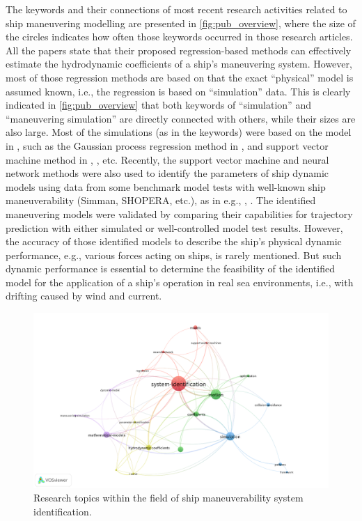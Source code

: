 The keywords and their connections of most recent research activities related to ship maneuvering modelling are presented in \autoref{fig:pub_overview}, where the size of the circles indicates how often those keywords occurred in those research articles. All the papers state that their proposed regression-based methods can effectively estimate the hydrodynamic coefficients of a ship’s maneuvering system. However, most of those regression methods are based on that the exact “physical” model is assumed known, i.e., the regression is based on “simulation” data. This is clearly indicated in \autoref{fig:pub_overview} that both keywords of “simulation” and “maneuvering simulation” are directly connected with others, while their sizes are also large.
Most of the simulations (as in the keywords) were based on the model in \citet{fossen_handbook_2021}, such as the Gaussian process regression method in \citet{xue_system_2020}, and support vector machine method in \citet{wang_identification_2019}, \citet{wang_parameter_2021}, etc. Recently, the support vector machine and neural network methods were also used to identify the parameters of ship dynamic models using data from some benchmark model tests with well-known ship maneuverability (Simman, SHOPERA, etc.), as in e.g., \citet{wang_kernel-based_2020}, \citet{wakita_neural_2021}. The identified maneuvering models were validated by comparing their capabilities for trajectory prediction with either simulated or well-controlled model test results. However, the accuracy of those identified models to describe the ship’s physical dynamic performance, e.g., various forces acting on ships, is rarely mentioned. But such dynamic performance is essential to determine the feasibility of the identified model for the application of a ship’s operation in real sea environments, i.e., with drifting caused by wind and current.
\begin{figure}[h]
  \includegraphics[width=\textwidth]{figures/keywords.png}
  \caption{Research topics within the field of ship maneuverability system identification.}
  \label{fig:pub_overview}
\end{figure}
